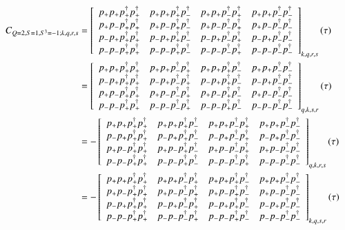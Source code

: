 \begin{equation}
  \begin{aligned} 
    C_{Q=2,S=1,S^3=-1;k,q,r,s} &=
    \left[
    \begin{array}{cccc}
      \cor{+}{+}{+}{+} & \cor{+}{+}{+}{-} & \cor{+}{+}{-}{+} & \cor{+}{+}{-}{-} \\
      \cor{+}{-}{+}{+} & \cor{+}{-}{+}{-} & \cor{+}{-}{-}{+} & \cor{+}{-}{-}{-} \\
      \cor{-}{+}{+}{+} & \cor{-}{+}{+}{-} & \cor{-}{+}{-}{+} & \cor{-}{+}{-}{-} \\
      \cor{-}{-}{+}{+} & \cor{-}{-}{+}{-} & \cor{-}{-}{-}{+} & \cor{-}{-}{-}{-} \\
    \end{array}
    \right]_{k,q,r,s} (\tau) \\
    &=\left[ 
    \begin{array}{cccc}
      \cor{+}{+}{+}{+} & \cor{+}{+}{-}{+} & \cor{+}{+}{+}{-} & \cor{+}{+}{-}{-} \\
      \cor{-}{+}{+}{+} & \cor{-}{+}{-}{+} & \cor{-}{+}{+}{-} & \cor{-}{+}{-}{-} \\
      \cor{+}{-}{+}{+} & \cor{+}{-}{-}{+} & \cor{+}{-}{+}{-} & \cor{+}{-}{-}{-} \\
      \cor{-}{-}{+}{+} & \cor{-}{-}{-}{+} & \cor{-}{-}{+}{-} & \cor{-}{-}{-}{-} \\
    \end{array}  
    \right]_{q,k,s,r} (\tau) \\
    &= - \left[
    \begin{array}{cccc}
      \cor{+}{+}{+}{+} & \cor{+}{+}{+}{-} & \cor{+}{+}{-}{+} & \cor{+}{+}{-}{-} \\
      \cor{-}{+}{+}{+} & \cor{-}{+}{+}{-} & \cor{-}{+}{-}{+} & \cor{-}{+}{-}{-} \\
      \cor{+}{-}{+}{+} & \cor{+}{-}{+}{-} & \cor{+}{-}{-}{+} & \cor{+}{-}{-}{-} \\
      \cor{-}{-}{+}{+} & \cor{-}{-}{+}{-} & \cor{-}{-}{-}{+} & \cor{-}{-}{-}{-} \\
    \end{array}
    \right]_{q,k,r,s} (\tau) \\
    &= - \left[
    \begin{array}{cccc}
      \cor{+}{+}{+}{+} & \cor{+}{+}{-}{+} & \cor{+}{+}{+}{-} & \cor{+}{+}{-}{-} \\
      \cor{+}{-}{+}{+} & \cor{+}{-}{-}{+} & \cor{+}{-}{+}{-} & \cor{+}{-}{-}{-} \\
      \cor{-}{+}{+}{+} & \cor{-}{+}{-}{+} & \cor{-}{+}{+}{-} & \cor{-}{+}{-}{-} \\
      \cor{-}{-}{+}{+} & \cor{-}{-}{-}{+} & \cor{-}{-}{+}{-} & \cor{-}{-}{-}{-} \\
    \end{array}
    \right]_{k,q,s,r} (\tau) \\
  \end{aligned}
\end{equation}

